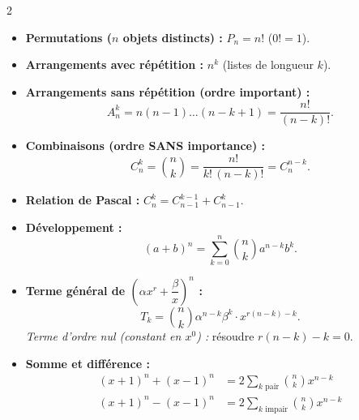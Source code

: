 {\begin{multicols}{2}
\vspace{3pt}
\begin{itemize}[leftmargin=1.2em, itemsep=1.5pt, topsep=2pt]
    \item \textbf{Permutations ($n$ objets distincts) :} $P_n = n!$ ($0! = 1$).
    \item \textbf{Arrangements avec répétition :} $n^k$ (listes de longueur $k$).
    \item \textbf{Arrangements sans répétition (ordre important) :}
    \[
        A_n^k = n(n-1)\dots(n-k+1) = \frac{n!}{(n-k)!}.
    \]
    \item \textbf{Combinaisons (ordre SANS importance) :}
    \[
        \boxed{C_n^k = \binom{n}{k} = \frac{n!}{k!\,(n-k)!} = C_n^{n-k}}.
    \]
    \item \textbf{Relation de Pascal :} $C_n^k = C_{n-1}^{k-1} + C_{n-1}^k$.
\end{itemize}

\columnbreak

\begin{itemize}[leftmargin=1.2em, itemsep=1.5pt, topsep=2pt]
    \item \textbf{Développement :}
    \[
        \boxed{(a + b)^n = \sum_{k=0}^n \binom{n}{k} a^{n-k} b^k}.
    \]
    \item \textbf{Terme général de $\left(\alpha x^r + \dfrac{\beta}{x}\right)^n$ :}
    \[
        T_k = \binom{n}{k}\alpha^{n-k}\beta^k \cdot x^{r(n-k) - k}.
    \]
    \emph{Terme d'ordre nul (constant en $x^0$) :} résoudre $r(n-k) - k = 0$.
    \item \textbf{Somme et différence :}
    \begin{align*}
        (x+1)^n + (x-1)^n &= 2\sum_{k \text{ pair}} \binom{n}{k} x^{n-k} \\
        (x+1)^n - (x-1)^n &= 2\sum_{k \text{ impair}} \binom{n}{k} x^{n-k}
    \end{align*}
\end{itemize}


\end{multicols}}
